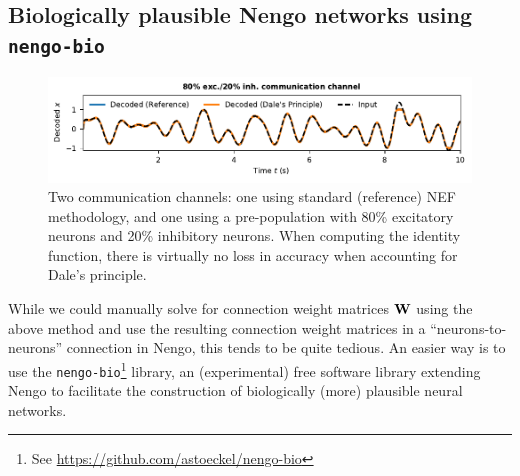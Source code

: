\documentclass[10pt,letterpaper,oneside]{article}
\begin{document}
\subsection{Biologically plausible Nengo networks using \texttt{nengo-bio}}

\begin{figure}
	\includegraphics{media/nengo_bio_communication_channel.pdf}
	\caption{Two communication channels: one using standard (reference) NEF methodology, and one using a pre-population with 80\% excitatory neurons and 20\% inhibitory neurons. When computing the identity function, there is virtually no loss in accuracy when accounting for Dale's principle. }
	\label{fig:nengo_bio_communication_channel}
\end{figure}

While we could manually solve for connection weight matrices ${\mathbf{W}}$ using the above method and use the resulting connection weight matrices in a \enquote{neurons-to-neurons} connection in Nengo, this tends to be quite tedious. An easier way is to use the \texttt{nengo-bio}\footnote{See \url{https://github.com/astoeckel/nengo-bio}} library, an (experimental) free software library extending Nengo to facilitate the construction of biologically (more) plausible neural networks.
\end{document}

